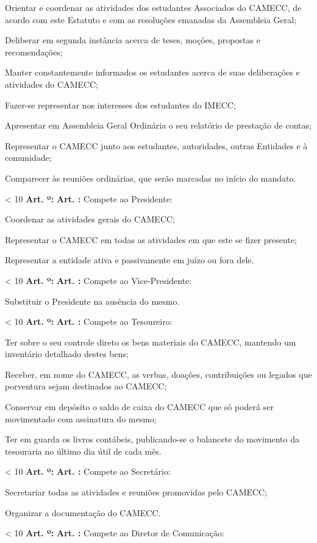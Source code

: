 \documentclass[capitulo]{br-lex}
\newcounter{tit}
\newcounter{art}
\renewcommand{\artigo}{
    \ifnum\value{art} < 10
        \textbf{Art. \arabic{art}º:}
    \else
        \textbf{Art. \arabic{art}:}
    \fi
    \stepcounter{art}
    \setcounter{inciso}{0}
    \setcounter{paragrafo}{0}
}
\begin{document}
\inciso Orientar e coordenar as atividades dos estudantes Associados do CAMECC, de acordo com este Estatuto e com as resoluções emanadas da Assembleia Geral;

\inciso Deliberar em segunda instância acerca de teses, moções, propostas e recomendações;

\inciso Manter constantemente informados os estudantes acerca de suas deliberações e atividades do CAMECC;

\inciso Fazer-se representar nos interesses dos estudantes do IMECC;

\inciso Apresentar em Assembleia Geral Ordinária o seu relatório de prestação de contas;

\inciso Representar o CAMECC junto aos estudantes, autoridades, outras Entidades e à comunidade;

\inciso Comparecer às reuniões ordinárias, que serão marcadas no início do mandato.

\artigo Compete ao Presidente:

\inciso Coordenar as atividades gerais do CAMECC;

\inciso Representar o CAMECC em todas as atividades em que este se fizer presente;

\inciso Representar a entidade ativa e passivamente em juízo ou fora dele.

\artigo Compete ao Vice-Presidente:

\inciso Substituir o Presidente na ausência do mesmo.

\artigo Compete ao Tesoureiro:

\inciso Ter sobre o seu controle direto os bens materiais do CAMECC, mantendo um inventário detalhado destes bens;

\inciso Receber, em nome do CAMECC, as verbas, doações, contribuições ou legados que porventura sejam destinados ao CAMECC;

\inciso Conservar em depósito o saldo de caixa do CAMECC que só poderá ser movimentado com assinatura do mesmo;

\inciso Ter em guarda os livros contábeis, publicando-se o balancete do movimento da tesouraria no último dia útil de cada mês.

\artigo Compete ao Secretário:

\inciso Secretariar todas as atividades e reuniões promovidas pelo CAMECC;

\inciso Organizar a documentação do CAMECC.

\artigo Compete ao Diretor de Comunicação:
\end{document}
